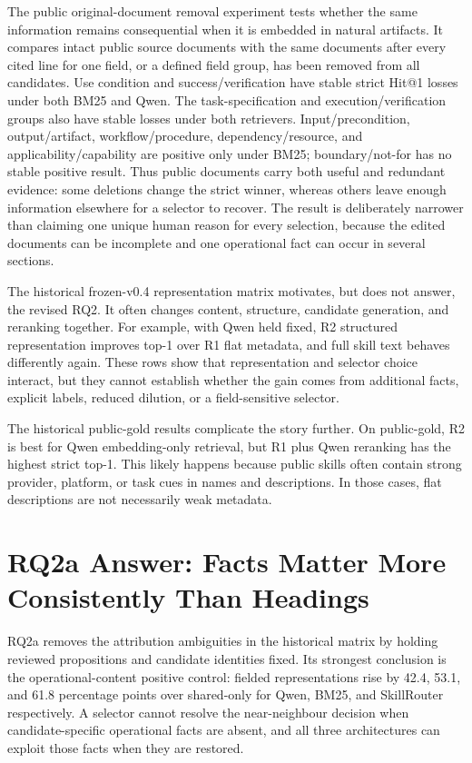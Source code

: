 The public original-document removal experiment tests whether the same information remains consequential when it is embedded in natural artifacts. It compares intact public source documents with the same documents after every cited line for one field, or a defined field group, has been removed from all candidates. Use condition and success/verification have stable strict Hit@1 losses under both BM25 and Qwen. The task-specification and execution/verification groups also have stable losses under both retrievers. Input/precondition, output/artifact, workflow/procedure, dependency/resource, and applicability/capability are positive only under BM25; boundary/not-for has no stable positive result. Thus public documents carry both useful and redundant evidence: some deletions change the strict winner, whereas others leave enough information elsewhere for a selector to recover. The result is deliberately narrower than claiming one unique human reason for every selection, because the edited documents can be incomplete and one operational fact can occur in several sections.

The historical frozen-v0.4 representation matrix motivates, but does not answer, the revised RQ2. It often changes content, structure, candidate generation, and reranking together. For example, with Qwen held fixed, R2 structured representation improves top-1 over R1 flat metadata, and full skill text behaves differently again. These rows show that representation and selector choice interact, but they cannot establish whether the gain comes from additional facts, explicit labels, reduced dilution, or a field-sensitive selector.

The historical public-gold results complicate the story further. On public-gold, R2 is best for Qwen embedding-only retrieval, but R1 plus Qwen reranking has the highest strict top-1. This likely happens because public skills often contain strong provider, platform, or task cues in names and descriptions. In those cases, flat descriptions are not necessarily weak metadata.

\section{RQ2a Answer: Facts Matter More Consistently Than Headings}

RQ2a removes the attribution ambiguities in the historical matrix by holding reviewed propositions and candidate identities fixed. Its strongest conclusion is the operational-content positive control: fielded representations rise by 42.4, 53.1, and 61.8 percentage points over shared-only for Qwen, BM25, and SkillRouter respectively. A selector cannot resolve the near-neighbour decision when candidate-specific operational facts are absent, and all three architectures can exploit those facts when they are restored.

